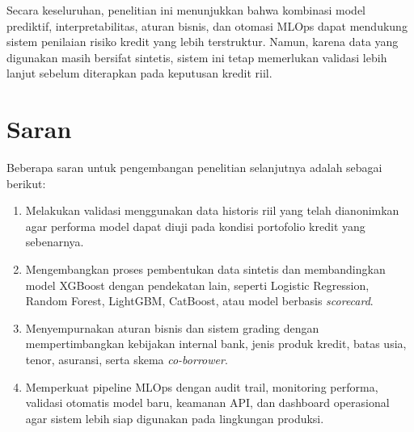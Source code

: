 Secara keseluruhan, penelitian ini menunjukkan bahwa kombinasi model prediktif, interpretabilitas, aturan bisnis, dan otomasi MLOps dapat mendukung sistem penilaian risiko kredit yang lebih terstruktur. Namun, karena data yang digunakan masih bersifat sintetis, sistem ini tetap memerlukan validasi lebih lanjut sebelum diterapkan pada keputusan kredit riil.

\section{Saran}
\label{sec:sec5_saran}
Beberapa saran untuk pengembangan penelitian selanjutnya adalah sebagai berikut:

\begin{enumerate}
    \item Melakukan validasi menggunakan data historis riil yang telah dianonimkan agar performa model dapat diuji pada kondisi portofolio kredit yang sebenarnya.

    \item Mengembangkan proses pembentukan data sintetis dan membandingkan model XGBoost dengan pendekatan lain, seperti Logistic Regression, Random Forest, LightGBM, CatBoost, atau model berbasis \textit{scorecard}.

    \item Menyempurnakan aturan bisnis dan sistem grading dengan mempertimbangkan kebijakan internal bank, jenis produk kredit, batas usia, tenor, asuransi, serta skema \textit{co-borrower}.

    \item Memperkuat pipeline MLOps dengan audit trail, monitoring performa, validasi otomatis model baru, keamanan API, dan dashboard operasional agar sistem lebih siap digunakan pada lingkungan produksi.
\end{enumerate}
